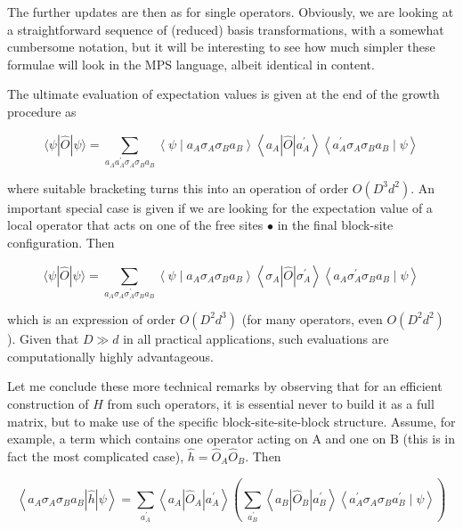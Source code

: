 \documentclass[12pt]{article}
\begin{document}
The further updates are then as for single operators. Obviously, we are looking at a straightforward sequence of (reduced) basis transformations, with a somewhat cumbersome notation, but it will be interesting to see how much simpler these formulae will look in the MPS language, albeit identical in content.

The ultimate evaluation of expectation values is given at the end of the growth procedure as


\begin{equation*}
\langle\psi|\hat{O}| \psi\rangle=\sum_{a_{A} a_{A}^{\prime} \sigma_{A} \sigma_{B} a_{B}}\left\langle\psi \mid a_{A} \sigma_{A} \sigma_{B} a_{B}\right\rangle\left\langle a_{A}|\hat{O}| a_{A}^{\prime}\right\rangle\left\langle a_{A}^{\prime} \sigma_{A} \sigma_{B} a_{B} \mid \psi\right\rangle \tag{10}
\end{equation*}


where suitable bracketing turns this into an operation of order $O\left(D^{3} d^{2}\right)$. An important special case is given if we are looking for the expectation value of a local operator that acts on one of the free sites $\bullet$ in the final block-site configuration. Then


\begin{equation*}
\langle\psi|\hat{O}| \psi\rangle=\sum_{a_{A} \sigma_{A} \sigma_{A}^{\prime} \sigma_{B} a_{B}}\left\langle\psi \mid a_{A} \sigma_{A} \sigma_{B} a_{B}\right\rangle\left\langle\sigma_{A}|\hat{O}| \sigma_{A}^{\prime}\right\rangle\left\langle a_{A} \sigma_{A}^{\prime} \sigma_{B} a_{B} \mid \psi\right\rangle \tag{11}
\end{equation*}


which is an expression of order $O\left(D^{2} d^{3}\right)$ (for many operators, even $O\left(D^{2} d^{2}\right)$ ). Given that $D \gg d$ in all practical applications, such evaluations are computationally highly advantageous.

Let me conclude these more technical remarks by observing that for an efficient construction of $\hat{H}$ from such operators, it is essential never to build it as a full matrix, but to make use of the specific block-site-site-block structure. Assume, for example, a term which contains one operator acting on $\mathrm{A}$ and one on $\mathrm{B}$ (this is in fact the most complicated case), $\hat{h}=\hat{O}_{A} \hat{O}_{B}$. Then


\begin{equation*}
\left\langle a_{A} \sigma_{A} \sigma_{B} a_{B}|\hat{h}| \psi\right\rangle=\sum_{a_{A}^{\prime}}\left\langle a_{A}\left|\hat{O}_{A}\right| a_{A}^{\prime}\right\rangle\left(\sum_{a_{B}^{\prime}}\left\langle a_{B}\left|\hat{O}_{B}\right| a_{B}^{\prime}\right\rangle\left\langle a_{A}^{\prime} \sigma_{A} \sigma_{B} a_{B}^{\prime} \mid \psi\right\rangle\right) \tag{12}
\end{equation*}
\end{document}
